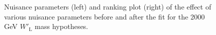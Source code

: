 \begin{figure}[H]
  \centering
  \caption{Nuisance parameters (left) and ranking plot (right) of the effect of various nuisance parameters before and after the fit for the 2000 GeV $W'_{\text{L}}$ mass hypotheses.}
  \label{fig:NuisParAndRanking_WpLH2000}
\end{figure}
